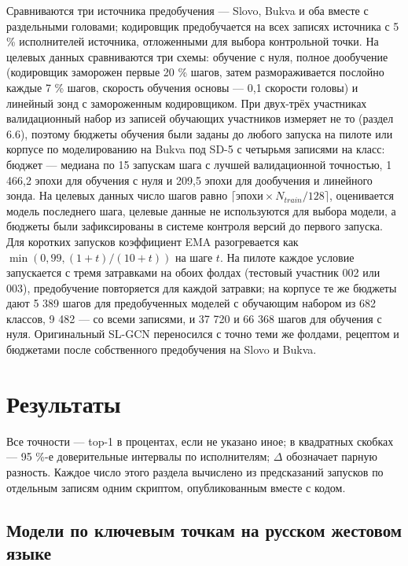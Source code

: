 Сравниваются три источника предобучения --- Slovo, Bukva и оба вместе с раздельными головами; кодировщик предобучается на всех записях источника с 5 \% исполнителей источника, отложенными для выбора контрольной точки. На целевых данных сравниваются три схемы: обучение с нуля, полное дообучение (кодировщик заморожен первые 20 \% шагов, затем размораживается послойно каждые 7 \% шагов, скорость обучения основы --- 0,1 скорости головы) и линейный зонд с замороженным кодировщиком. При двух-трёх участниках валидационный набор из записей обучающих участников измеряет не то (раздел 6.6), поэтому бюджеты обучения были заданы до любого запуска на пилоте или корпусе по моделированию на Bukva под SD-5 с четырьмя записями на класс: бюджет --- медиана по 15 запускам шага с лучшей валидационной точностью, 1 466,2 эпохи для обучения с нуля и 209,5 эпохи для дообучения и линейного зонда. На целевых данных число шагов равно \(\lceil \text{эпохи} \times N_{train}/128 \rceil\), оценивается модель последнего шага, целевые данные не используются для выбора модели, а бюджеты были зафиксированы в системе контроля версий до первого запуска. Для коротких запусков коэффициент EMA разогревается как \(\min(0{,}99, (1+t)/(10+t))\) на шаге \(t\). На пилоте каждое условие запускается с тремя затравками на обоих фолдах (тестовый участник 002 или 003), предобучение повторяется для каждой затравки; на корпусе те же бюджеты дают 5 389 шагов для предобученных моделей с обучающим набором из 682 классов, 9 482 --- со всеми записями, и 37 720 и 66 368 шагов для обучения с нуля. Оригинальный SL-GCN переносился с точно теми же фолдами, рецептом и бюджетами после собственного предобучения на Slovo и Bukva.

\hypertarget{ux440ux435ux437ux443ux43bux44cux442ux430ux442ux44b}{%
\section{Результаты}\label{ux440ux435ux437ux443ux43bux44cux442ux430ux442ux44b}}

Все точности --- top-1 в процентах, если не указано иное; в квадратных скобках --- 95 \%-е доверительные интервалы по исполнителям; \(\Delta\) обозначает парную разность. Каждое число этого раздела вычислено из предсказаний запусков по отдельным записям одним скриптом, опубликованным вместе с кодом.

\hypertarget{ux43cux43eux434ux435ux43bux438-ux43fux43e-ux43aux43bux44eux447ux435ux432ux44bux43c-ux442ux43eux447ux43aux430ux43c-ux43dux430-ux440ux443ux441ux441ux43aux43eux43c-ux436ux435ux441ux442ux43eux432ux43eux43c-ux44fux437ux44bux43aux435}{%
\subsection{Модели по ключевым точкам на русском жестовом языке}\label{ux43cux43eux434ux435ux43bux438-ux43fux43e-ux43aux43bux44eux447ux435ux432ux44bux43c-ux442ux43eux447ux43aux430ux43c-ux43dux430-ux440ux443ux441ux441ux43aux43eux43c-ux436ux435ux441ux442ux43eux432ux43eux43c-ux44fux437ux44bux43aux435}}

